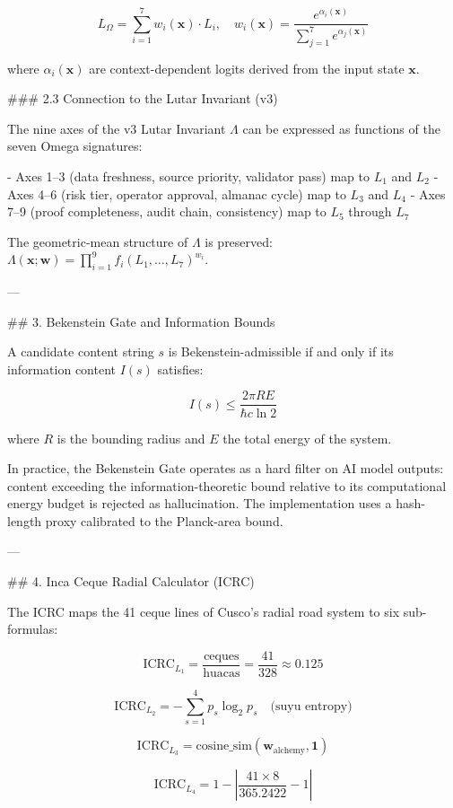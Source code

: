 \[
L_\Omega = \sum_{i=1}^{7} w_i(\mathbf{x}) \cdot L_i, \quad w_i(\mathbf{x}) = \frac{e^{\alpha_i(\mathbf{x})}}{\sum_{j=1}^{7} e^{\alpha_j(\mathbf{x})}}
\]

where \( \alpha_i(\mathbf{x}) \) are context-dependent logits derived from the input state \( \mathbf{x} \).

### 2.3 Connection to the Lutar Invariant (v3)

The nine axes of the v3 Lutar Invariant \( \Lambda \) can be expressed as functions of the seven Omega signatures:

- Axes 1--3 (data freshness, source priority, validator pass) map to \( L_1 \) and \( L_2 \)
- Axes 4--6 (risk tier, operator approval, almanac cycle) map to \( L_3 \) and \( L_4 \)
- Axes 7--9 (proof completeness, audit chain, consistency) map to \( L_5 \) through \( L_7 \)

The geometric-mean structure of \( \Lambda \) is preserved: \( \Lambda(\mathbf{x}; \mathbf{w}) = \prod_{i=1}^{9} f_i(L_1, \ldots, L_7)^{w_i} \).

---

## 3. Bekenstein Gate and Information Bounds

A candidate content string \( s \) is Bekenstein-admissible if and only if its information content \( I(s) \) satisfies:

\[
I(s) \leq \frac{2\pi R E}{\hbar c \ln 2}
\]

where \( R \) is the bounding radius and \( E \) the total energy of the system.

In practice, the Bekenstein Gate operates as a hard filter on AI model outputs: content exceeding the information-theoretic bound relative to its computational energy budget is rejected as hallucination. The implementation uses a hash-length proxy calibrated to the Planck-area bound.

---

## 4. Inca Ceque Radial Calculator (ICRC)

The ICRC maps the 41 ceque lines of Cusco's radial road system to six sub-formulas:

\[
\text{ICRC}_{L_1} = \frac{\text{ceques}}{\text{huacas}} = \frac{41}{328} \approx 0.125
\]

\[
\text{ICRC}_{L_2} = -\sum_{s=1}^{4} p_s \log_2 p_s \quad \text{(suyu entropy)}
\]

\[
\text{ICRC}_{L_3} = \text{cosine\_sim}(\mathbf{w}_{\text{alchemy}}, \mathbf{1})
\]

\[
\text{ICRC}_{L_4} = 1 - \left|\frac{41 \times 8}{365.2422} - 1\right|
\]

